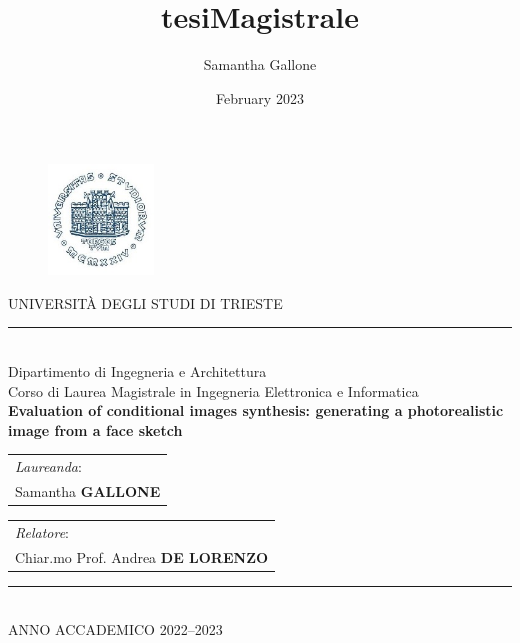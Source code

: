 \documentclass[paper=a4, fontsize=14pt, titlepage, oneside]{article}
\title{tesiMagistrale}
\author{Samantha Gallone}
\date{February 2023}
\begin{document}
\thispagestyle{empty}
\setcounter{page}{0}

 \begin{figure}[htbp]
	\centering
	\includegraphics[width=%
	 0.25\textwidth]{figures/unitsLogo.jpg}
	\end{figure}
\begin{center}

\Large

UNIVERSIT\`A DEGLI STUDI DI TRIESTE\\
\vspace{-0.4cm}
\rule{8cm}{0.2mm}\\
\large
Dipartimento di Ingegneria e Architettura\\
\bigskip
Corso di Laurea Magistrale in Ingegneria Elettronica e Informatica \\
\vfill %
{}
\LARGE{\textbf{Evaluation of conditional images synthesis: generating a photorealistic image from a face sketch}}\\
\vfill %
{}
\end{center}
\vfill
%
\begin{tabular}[t]{l}
\textit{Laureanda}:\\
Samantha \textbf{GALLONE}
\end{tabular}
\hfill 
%
\begin{tabular}[t]{l}
\textit{Relatore}: \\
Chiar.mo Prof. Andrea \textbf{DE LORENZO}
\end{tabular}
\vfill
\begin{center}
\normalsize
\rule{8cm}{0.1mm}\\
\bigskip
ANNO ACCADEMICO 2022--2023
\end{center}
\end{document}
